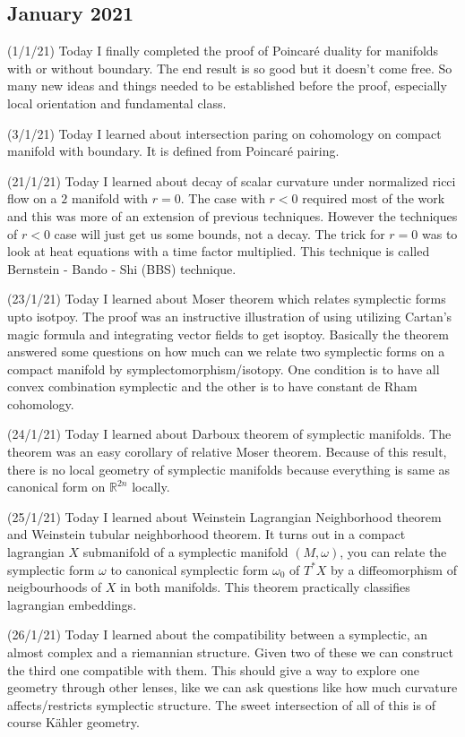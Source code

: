 \documentclass[12pt,a4paper]{article}
\begin{document}
 
 \subsection*{January 2021}
 
 
 \quad (1/1/21) Today I finally completed the proof of Poincaré duality for manifolds with or without boundary. The end result is so good but it doesn't come free. So many new ideas and things needed to be established before the proof, especially local orientation and fundamental class.
 
 (3/1/21) Today I learned about intersection paring on cohomology on compact manifold with boundary. It is defined from Poincaré pairing. 
 
 (21/1/21) Today I learned about decay of scalar curvature under normalized ricci flow on a $2$ manifold with $r=0$. The case with $r<0$ required most of the work and this was more of an extension of previous techniques. However the techniques of $r<0$ case will just get us some bounds, not a decay. The trick for $r=0$ was to look at heat equations with a time factor multiplied. This technique is called Bernstein - Bando - Shi (BBS) technique. 
 
 (23/1/21) Today I learned about Moser theorem which relates symplectic forms upto isotpoy. The proof was an instructive illustration of using utilizing Cartan's magic formula and integrating vector fields to get isoptoy. Basically the theorem answered some questions on how much can we relate two symplectic forms on a compact manifold by symplectomorphism/isotopy. One condition is to have all convex combination symplectic and the other is to have constant de Rham cohomology.
 
 (24/1/21) Today I learned about Darboux theorem of symplectic manifolds. The theorem was an easy corollary of relative Moser theorem. Because of this result, there is no local geometry of symplectic manifolds because everything is same as canonical form on $\mathbb{R}^{2n}$ locally. 
 
 (25/1/21) Today I learned about Weinstein Lagrangian Neighborhood theorem and Weinstein tubular neighborhood theorem. It turns out in a compact lagrangian $X$ submanifold of a symplectic manifold $(M,\omega)$, you can relate the symplectic form $\omega$ to canonical symplectic form $\omega_0$ of $T^{*}X$ by a diffeomorphism of neigbourhoods of $X$ in both manifolds. This theorem practically classifies lagrangian embeddings.
 
 (26/1/21) Today I learned about the compatibility between a symplectic, an almost complex and a riemannian structure. Given two of these we can construct the third one compatible with them. This should give a way to explore one geometry through other lenses, like we can ask questions like how  much curvature affects/restricts symplectic structure. The sweet intersection of all of this is of course K\"{a}hler geometry.
 
\end{document}
